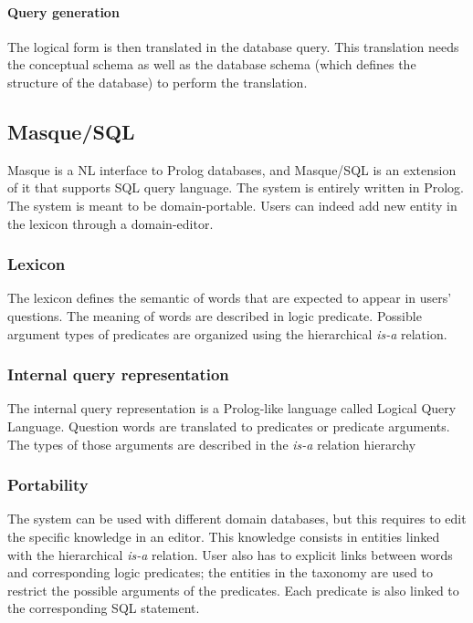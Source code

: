 \documentclass[10pt,journal,letterpaper,compsoc]{IEEEtran}
\begin{document}
\paragraph{Query generation}
The logical form is then translated in the database query. This translation
needs the conceptual schema as well as the database schema (which defines the
structure of the database) to perform the translation. 





\subsection{{\sc Masque/SQL}~\cite{Androutsopoulos93masque}}
{\sc Masque} is a NL interface to Prolog databases, and {\sc Masque/SQL} is an
extension of it that supports SQL query language. The system is entirely written
in Prolog.
The system is meant to be domain-portable. Users can indeed add new entity in
the lexicon through a domain-editor.

\subsubsection{Lexicon}
The lexicon defines the semantic of words that are expected to appear
in users' questions. The meaning of words are described in logic predicate.
Possible argument types of predicates are organized using the hierarchical {\it
is-a} relation.

\subsubsection{Internal query representation}
The internal query representation is a Prolog-like language called Logical Query
Language.
Question words are translated to predicates or predicate arguments. The types of
those arguments are described in the {\it is-a} relation hierarchy

\subsubsection{Portability}
The system can be used with different domain databases, but
this requires to edit the specific knowledge in an editor. This knowledge
consists in entities linked with the hierarchical {\it is-a} relation. User
also has to explicit links between words and corresponding logic predicates;
the entities in the taxonomy are used to restrict the possible arguments of
the predicates. Each predicate is also linked to the corresponding SQL
statement.
\end{document}
